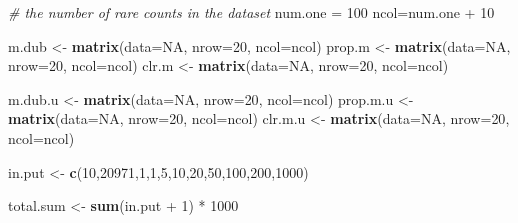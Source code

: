 \documentclass[twocolumn]{article}
\newenvironment{Shaded}{\begin{snugshade}}{\end{snugshade}}
\newcommand{\KeywordTok}[1]{\textcolor[rgb]{0.13,0.29,0.53}{\textbf{{#1}}}}
\newcommand{\DataTypeTok}[1]{\textcolor[rgb]{0.13,0.29,0.53}{{#1}}}
\newcommand{\DecValTok}[1]{\textcolor[rgb]{0.00,0.00,0.81}{{#1}}}
\newcommand{\StringTok}[1]{\textcolor[rgb]{0.31,0.60,0.02}{{#1}}}
\newcommand{\CommentTok}[1]{\textcolor[rgb]{0.56,0.35,0.01}{\textit{{#1}}}}
\newcommand{\OtherTok}[1]{\textcolor[rgb]{0.56,0.35,0.01}{{#1}}}
\newcommand{\NormalTok}[1]{{#1}}
\begin{document}
\begin{Shaded}
\begin{Highlighting}[]
\CommentTok{# the number of rare counts in the dataset}
\NormalTok{num.one =}\StringTok{ }\DecValTok{100}
\NormalTok{ncol=num.one +}\StringTok{ }\DecValTok{10}

\NormalTok{m.dub <-}\StringTok{ }\KeywordTok{matrix}\NormalTok{(}\DataTypeTok{data=}\OtherTok{NA}\NormalTok{, }\DataTypeTok{nrow=}\DecValTok{20}\NormalTok{, }\DataTypeTok{ncol=}\NormalTok{ncol)}
\NormalTok{prop.m <-}\StringTok{ }\KeywordTok{matrix}\NormalTok{(}\DataTypeTok{data=}\OtherTok{NA}\NormalTok{, }\DataTypeTok{nrow=}\DecValTok{20}\NormalTok{, }\DataTypeTok{ncol=}\NormalTok{ncol)}
\NormalTok{clr.m <-}\StringTok{ }\KeywordTok{matrix}\NormalTok{(}\DataTypeTok{data=}\OtherTok{NA}\NormalTok{, }\DataTypeTok{nrow=}\DecValTok{20}\NormalTok{, }\DataTypeTok{ncol=}\NormalTok{ncol)}

\NormalTok{m.dub.u <-}\StringTok{ }\KeywordTok{matrix}\NormalTok{(}\DataTypeTok{data=}\OtherTok{NA}\NormalTok{, }\DataTypeTok{nrow=}\DecValTok{20}\NormalTok{, }\DataTypeTok{ncol=}\NormalTok{ncol)}
\NormalTok{prop.m.u <-}\StringTok{ }\KeywordTok{matrix}\NormalTok{(}\DataTypeTok{data=}\OtherTok{NA}\NormalTok{, }\DataTypeTok{nrow=}\DecValTok{20}\NormalTok{, }\DataTypeTok{ncol=}\NormalTok{ncol)}
\NormalTok{clr.m.u <-}\StringTok{ }\KeywordTok{matrix}\NormalTok{(}\DataTypeTok{data=}\OtherTok{NA}\NormalTok{, }\DataTypeTok{nrow=}\DecValTok{20}\NormalTok{, }\DataTypeTok{ncol=}\NormalTok{ncol)}

\NormalTok{in.put <-}\StringTok{ }\KeywordTok{c}\NormalTok{(}\DecValTok{10}\NormalTok{,}\DecValTok{20971}\NormalTok{,}\DecValTok{1}\NormalTok{,}\DecValTok{1}\NormalTok{,}\DecValTok{5}\NormalTok{,}\DecValTok{10}\NormalTok{,}\DecValTok{20}\NormalTok{,}\DecValTok{50}\NormalTok{,}\DecValTok{100}\NormalTok{,}\DecValTok{200}\NormalTok{,}\DecValTok{1000}\NormalTok{)}

\NormalTok{total.sum <-}\StringTok{ }\KeywordTok{sum}\NormalTok{(in.put +}\StringTok{ }\DecValTok{1}\NormalTok{) *}\StringTok{ }\DecValTok{1000}


\end{Highlighting}
\end{Shaded}
\end{document}
